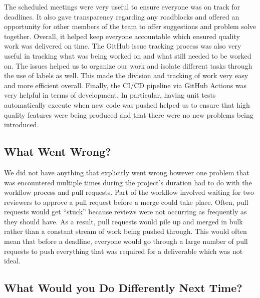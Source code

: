 \documentclass{article}
\begin{document}
The scheduled meetings were very useful to ensure everyone was on track for deadlines.
It also gave transparency regarding any roadblocks and offered an opportunity for other members
of the team to offer suggestions and problem solve together. Overall, it helped keep everyone accountable
which ensured quality work was delivered on time. The GitHub issue tracking process was also very
useful in tracking what was being worked on and what still needed to be worked on. The issues helped us to organize
our work and isolate different tasks through the use of labels as well. This made the division and tracking of work
very easy and more efficient overall. Finally, the CI/CD pipeline via GitHub Actions was very helpful in terms
of development. In particular, having unit tests automatically execute when new code was
pushed helped us to ensure that high quality features were being produced and that there were no new problems being introduced.

\subsection{What Went Wrong?}


We did not have anything that explicitly went wrong however one problem that was encountered multiple times during
the project's duration had to do with the workflow process and pull requests. Part of the workflow
involved waiting for two reviewers to approve a pull request before a merge could take place. Often,
pull requests would get ``stuck'' because reviews were not occurring as frequently
as they should have. As a result, pull requests would pile up and merged in bulk rather than a constant stream
of work being pushed through. This would often mean that before a deadline, everyone would go through
a large number of pull requests to push everything that was required for a deliverable which was not ideal.

\subsection{What Would you Do Differently Next Time?}

\end{document}
